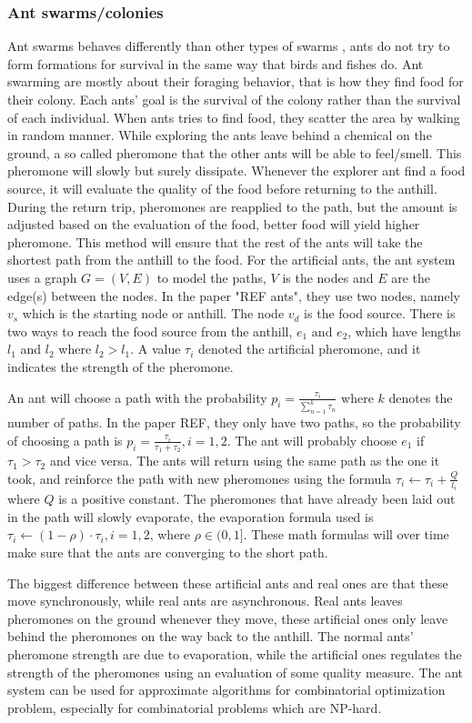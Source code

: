 \subsubsection{Ant swarms/colonies}
Ant swarms behaves differently than other types of swarms \cite{Blum2005}, ants do not try to form formations for survival in the same way that birds and fishes do. Ant swarming are mostly about their foraging behavior, that is how they find food for their colony. Each ants' goal is the survival of the colony rather than the survival of each individual. When ants tries to find food, they scatter the area by walking in random manner. While exploring the ants leave behind a chemical on the ground, a so called pheromone that the other ants will be able to feel/smell. This pheromone will slowly but surely dissipate. Whenever the explorer ant find a food source, it will evaluate the quality of the food before returning to the anthill. During the return trip, pheromones are reapplied to the path, but the amount is adjusted based on the evaluation of the food, better food will yield higher pheromone. This method will ensure that the rest of the ants will take the shortest path from the anthill to the food. For the artificial ants, the ant system uses a graph $G = (V,E)$ to model the paths, $V$ is the nodes and $E$ are the edge(s) between the nodes. In the paper "REF ants", they use two nodes, namely $v_s$ which is the starting node or anthill. The node $v_d$ is the food source. There is two ways to reach the food source from the anthill, $e_1$ and $e_2$, which have lengths $l_1$ and $l_2$ where $l_2 > l_1$. A value $\tau_i$ denoted the artificial pheromone, and it indicates the strength of the pheromone. 

An ant will choose a path with the probability $p_i = \frac{\tau_i}{\sum_{ n = 1}^{k}\tau_n}$ where $k$ denotes the number of paths. In the paper REF, they only have two paths, so the probability of choosing a path is $p_i = \frac{\tau_i}{\tau_1 + \tau_2}, i = 1,2$.
The ant will probably choose $e_1$ if $\tau_1 > \tau_2$ and vice versa.
The ants will return using the same path as the one it took, and reinforce the path with new pheromones using the formula $\tau_i \leftarrow \tau_i + \frac{Q}{l_i}$ where $Q$ is a positive constant. The pheromones that have already been laid out in the path will slowly evaporate, the evaporation formula used is $\tau_i \leftarrow (1-\rho)\cdot\tau_i, i = 1,2$, where $\rho \in (0,1]$. These math formulas will over time make sure that the ants are converging to the short path.

The biggest difference between these artificial ants and real ones are that these move synchronously, while real ants are asynchronous. Real ants leaves pheromones on the ground whenever they move, these artificial ones only leave behind the pheromones on the way back to the anthill. The normal ants' pheromone strength are due to evaporation, while the artificial ones regulates the strength of the pheromones using an evaluation of some quality measure. The ant system can be used for approximate algorithms for combinatorial optimization problem, especially for combinatorial problems which are NP-hard.